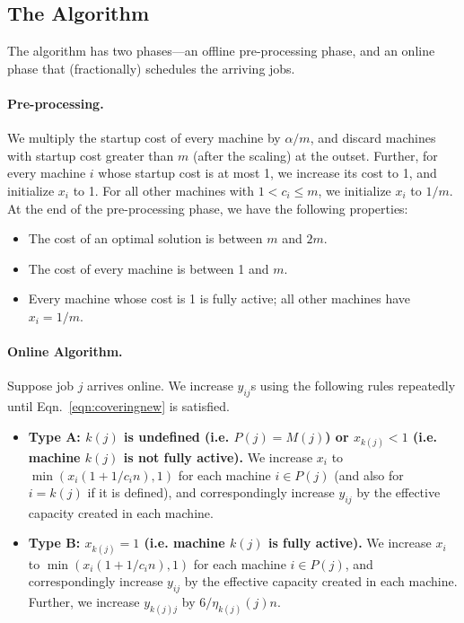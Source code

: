 \documentclass[11pt]{article}
\begin{document}
\subsection{The Algorithm}
The algorithm has two phases---an offline pre-processing phase, and
an online phase that (fractionally) schedules the arriving jobs.
 
\paragraph{Pre-processing.} We multiply the startup cost of every machine
by $\alpha/m$, and discard machines with startup cost greater than $m$
(after the scaling) at the outset. Further, for every machine $i$
whose startup cost is at most 1, we increase its
cost to 1, and initialize $x_i$ to 1. For all other
machines with $1 < c_i \leq m$, we initialize $x_i$ to $1/m$.
At the end of the pre-processing phase, we have the following properties:
\begin{itemize}
	\item The cost of an optimal solution is between $m$ and $2m$.
	\item The cost of every machine is between 1 and $m$.
	\item Every machine whose cost is 1 is fully active; all other
	machines have $x_i = 1/m$.
\end{itemize}



\paragraph{Online Algorithm.}
Suppose job $j$ arrives online. 
We increase $y_{ij}$s using the following rules repeatedly until 
Eqn.~\ref{eqn:coveringnew} is satisfied.
\begin{itemize}
\item {\bf Type A: $k(j)$ is undefined (i.e. $P(j) = M(j)$) or 
$x_{k(j)} < 1$ (i.e. machine $k(j)$ is not fully active).} 
We increase $x_i$ to $\min(x_i(1+1/c_i n), 1)$ for each machine 
$i\in P(j)$ (and also for $i= k(j)$ if it is defined), and correspondingly
increase $y_{ij}$ by the effective capacity created in each machine.
\item {\bf Type B: $x_{k(j)} = 1$ (i.e. machine $k(j)$ is fully active).}
We increase $x_i$ to $\min(x_i(1 + 1/c_i n), 1)$ for each machine 
$i\in P(j)$, and correspondingly increase $y_{ij}$ by the effective 
capacity created in each machine. Further,
we increase $y_{k(j)j}$ by $6/\eta_{k(j)}(j) n$. 
\end{itemize}
\end{document}

